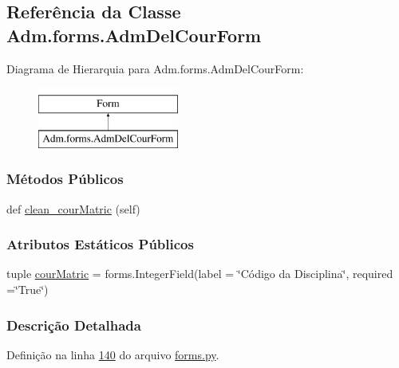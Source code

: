 \hypertarget{classAdm_1_1forms_1_1AdmDelCourForm}{}\subsection{Referência da Classe Adm.\+forms.\+Adm\+Del\+Cour\+Form}
\label{classAdm_1_1forms_1_1AdmDelCourForm}
Diagrama de Hierarquia para Adm.\+forms.\+Adm\+Del\+Cour\+Form\+:\begin{figure}[H]
\begin{center}
\leavevmode
\includegraphics[height=2.000000cm]{da/d13/classAdm_1_1forms_1_1AdmDelCourForm}
\end{center}
\end{figure}
\subsubsection*{Métodos Públicos}
\begin{DoxyCompactItemize}
\item 
def \hyperlink{classAdm_1_1forms_1_1AdmDelCourForm_a29bd1262c5a7db10cbecdc8ba44da63b}{clean\+\_\+cour\+Matric} (self)
\end{DoxyCompactItemize}
\subsubsection*{Atributos Estáticos Públicos}
\begin{DoxyCompactItemize}
\item 
tuple \hyperlink{classAdm_1_1forms_1_1AdmDelCourForm_a8ed2bcde12e5bb321960517b3c653b2f}{cour\+Matric} = forms.\+Integer\+Field(label = \char`\"{}Código da Disciplina\char`\"{}, required =\char`\"{}True\char`\"{})
\end{DoxyCompactItemize}


\subsubsection{Descrição Detalhada}


Definição na linha \hyperlink{Adm_2forms_8py_source_l00140}{140} do arquivo \hyperlink{Adm_2forms_8py_source}{forms.\+py}.



